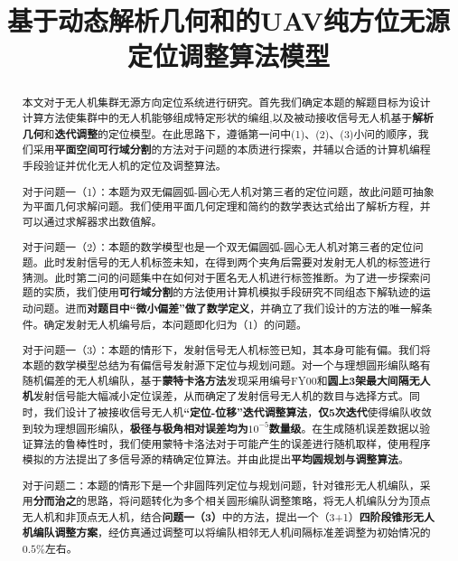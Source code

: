 \documentclass[withoutpreface,bwprint]{cumcmthesis} %
\title{基于动态解析几何和的UAV纯方位无源定位调整算法模型}
\begin{document}
	\maketitle
\begin{abstract}
	\par 本文对于无人机集群无源方向定位系统进行研究。首先我们确定本题的解题目标为设计计算方法使集群中的无人机能够组成特定形状的编组,以及被动接收信号无人机基于\textbf{解析几何}和\textbf{迭代调整}的定位模型。在此思路下，遵循第一问中(1)、(2)、(3)小问的顺序，我们采用\textbf{平面空间可行域分割}的方法对于问题的本质进行探索，并辅以合适的计算机编程手段验证并优化无人机的定位及调整算法。
	\par 对于问题一（1）：本题为双无偏圆弧-圆心无人机对第三者的定位问题，故此问题可抽象为平面几何求解问题。我们使用平面几何定理和简约的数学表达式给出了解析方程，并可以通过求解器求出数值解。
	\par 对于问题一（2）：本题的数学模型也是一个双无偏圆弧-圆心无人机对第三者的定位问题。此时发射信号的无人机标签未知，在得到两个夹角后需要对发射无人机的标签进行猜测。此时第二问的问题集中在如何对于匿名无人机进行标签推断。为了进一步探索问题的实质，我们使用\textbf{可行域分割}的方法使用计算机模拟手段研究不同组态下解轨迹的运动问题。进而\textbf{对题目中“微小偏差”做了数学定义}，并确立了我们设计的方法的唯一解条件。确定发射无人机编号后，本问题即化归为（1）的问题。
	\par 对于问题一（3）：本题的情形下，发射信号无人机标签已知，其本身可能有偏。我们将本题的数学模型总结为有偏信号发射源下定位与规划问题。对一个与理想圆形编队略有随机偏差的无人机编队，基于\textbf{蒙特卡洛方法}发现采用编号FY00和\textbf{圆上3架最大间隔无人机}发射信号能大幅减小定位误差，从而确定了发射信号无人机的数目与选择方式。同时，我们设计了被接收信号无人机\textbf{“定位-位移”迭代调整算法}，\textbf{仅5次迭代}使得编队收敛到较为理想圆形编队，\textbf{极径与极角相对误差均为$10^{-5}$数量级}。在生成随机误差数据以验证算法的鲁棒性时，我们使用蒙特卡洛法\cite{meta}对于可能产生的误差进行随机取样，使用程序模拟的方法提出了多信号源的精确定位算法。并由此提出\textbf{平均圆规划与调整算法}。
	\par 对于问题二：本题的情形下是一个非圆阵列定位与规划问题，针对锥形无人机编队，采用\textbf{分而治之}的思路，将问题转化为多个相关圆形编队调整策略，将无人机编队分为顶点无人机和非顶点无人机，结合\textbf{问题一（3）}中的方法，提出一个（3+1）\textbf{四阶段锥形无人机编队调整方案}，经仿真通过调整可以将编队相邻无人机间隔标准差调整为初始情况的$0.5\%$左右。
	
	
	
\end{abstract}
	
\end{document}
